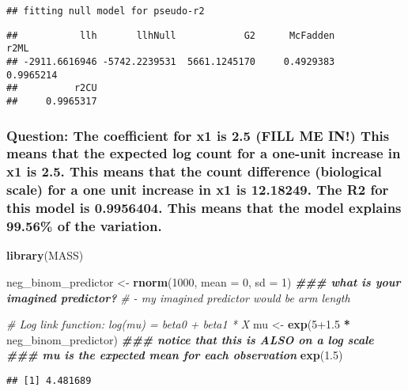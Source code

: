 \documentclass[
]{article}
\newenvironment{Shaded}{\begin{snugshade}}{\end{snugshade}}
\newcommand{\AttributeTok}[1]{\textcolor[rgb]{0.13,0.29,0.53}{#1}}
\newcommand{\CommentTok}[1]{\textcolor[rgb]{0.56,0.35,0.01}{\textit{#1}}}
\newcommand{\DecValTok}[1]{\textcolor[rgb]{0.00,0.00,0.81}{#1}}
\newcommand{\DocumentationTok}[1]{\textcolor[rgb]{0.56,0.35,0.01}{\textbf{\textit{#1}}}}
\newcommand{\FloatTok}[1]{\textcolor[rgb]{0.00,0.00,0.81}{#1}}
\newcommand{\FunctionTok}[1]{\textcolor[rgb]{0.13,0.29,0.53}{\textbf{#1}}}
\newcommand{\NormalTok}[1]{#1}
\newcommand{\OtherTok}[1]{\textcolor[rgb]{0.56,0.35,0.01}{#1}}
\newcommand{\SpecialCharTok}[1]{\textcolor[rgb]{0.81,0.36,0.00}{\textbf{#1}}}
\begin{document}
\begin{verbatim}
## fitting null model for pseudo-r2
\end{verbatim}

\begin{verbatim}
##           llh       llhNull            G2      McFadden          r2ML 
## -2911.6616946 -5742.2239531  5661.1245170     0.4929383     0.9965214 
##          r2CU 
##     0.9965317
\end{verbatim}

\subsubsection{Question: The coefficient for x1 is 2.5 (FILL ME IN!)
This means that the expected log count for a one-unit increase in x1 is
2.5. This means that the count difference (biological scale) for a one
unit increase in x1 is 12.18249. The R2 for this model is 0.9956404.
This means that the model explains 99.56\% of the
variation.}\label{question-the-coefficient-for-x1-is-2.5-fill-me-in-this-means-that-the-expected-log-count-for-a-one-unit-increase-in-x1-is-2.5.-this-means-that-the-count-difference-biological-scale-for-a-one-unit-increase-in-x1-is-12.18249.-the-r2-for-this-model-is-0.9956404.-this-means-that-the-model-explains-99.56-of-the-variation.}

\begin{Shaded}
\begin{Highlighting}[]
\FunctionTok{library}\NormalTok{(MASS)}

\NormalTok{neg\_binom\_predictor }\OtherTok{\textless{}{-}} \FunctionTok{rnorm}\NormalTok{(}\DecValTok{1000}\NormalTok{, }\AttributeTok{mean =} \DecValTok{0}\NormalTok{, }\AttributeTok{sd =} \DecValTok{1}\NormalTok{) }\DocumentationTok{\#\#\# what is your imagined predictor?}
\CommentTok{\# {-} my imagined predictor would be arm length }

\CommentTok{\# Log link function: log(mu) = beta0 + beta1 * X}
\NormalTok{mu }\OtherTok{\textless{}{-}} \FunctionTok{exp}\NormalTok{(}\DecValTok{5}\FloatTok{+1.5} \SpecialCharTok{*}\NormalTok{ neg\_binom\_predictor) }\DocumentationTok{\#\#\# notice that this is ALSO on a log scale}
\DocumentationTok{\#\#\# mu is the expected mean for each observation}
\FunctionTok{exp}\NormalTok{(}\FloatTok{1.5}\NormalTok{)}
\end{Highlighting}
\end{Shaded}

\begin{verbatim}
## [1] 4.481689
\end{verbatim}
\end{document}

